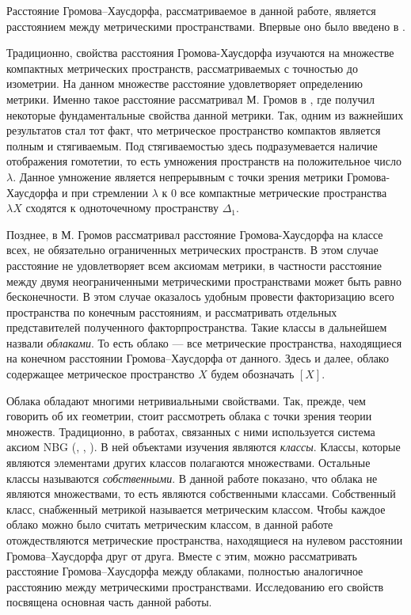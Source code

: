 Расстояние Громова--Хаусдорфа, рассматриваемое в данной работе,
является расстоянием
между метрическими пространствами. Впервые оно было введено в \cite{Edwards}.

Традиционно, свойства расстояния
Громова-Хаусдорфа
изучаются на множестве компактных метрических пространств,
рассматриваемых с точностью до изометрии. На данном множестве
расстояние удовлетворяет определению метрики. Именно такое расстояние
рассматривал М. Громов в \cite{gromov_structures_1981}, где получил
некоторые фундаментальные свойства данной метрики. Так, одним из
важнейших результатов стал тот факт, что метрическое пространство
компактов является полным и стягиваемым. Под стягиваемостью здесь
подразумевается наличие отображения гомотетии, то есть умножения
пространств на положительное число \( \lambda  \). Данное умножение
является непрерывным с точки зрения метрики Громова-Хаусдорфа и при
стремлении \( \lambda  \) к \( 0 \) все компактные метрические
пространства \( \lambda X \) сходятся к одноточечному пространству \(
\Delta _1 \).

Позднее, в \cite{gromov_metric_2001} М. Громов рассматривал
расстояние Громова-Хаусдорфа на классе всех, не обязательно
ограниченных метрических пространств. В этом случае расстояние не
удовлетворяет всем аксиомам метрики, в частности расстояние между
двумя неограниченными метрическими пространствами может быть равно
бесконечности. В этом случае оказалось удобным провести факторизацию
всего пространства по конечным расстояниям, и рассматривать отдельных
представителей полученного факторпространства. Такие классы в
дальнейшем назвали \emph{облаками}. То есть облако --- все
метрические пространства, находящиеся на конечном расстоянии
Громова--Хаусдорфа от данного. Здесь и далее, облако содержащее
метрическое пространство \( X \) будем обозначать \( [X] \).

Облака обладают многими нетривиальными свойствами. Так, прежде, чем
говорить об их геометрии, стоит рассмотреть облака с точки зрения
теории множеств. Традиционно, в работах, связанных с ними
используется система аксиом NBG (\cite{bernays_system_1937},
\cite{godel_consistency_1940}, \cite{neumann_1925}). В ней
объектами изучения являются \emph{классы}. Классы, которые являются
элементами других классов полагаются множествами. Остальные классы
называются \emph{собственными}. В данной работе показано, что облака
не являются множествами, то есть являются собственными классами.
Собственный класс, снабженный метрикой называется метрическим
классом. Чтобы каждое облако можно было считать метрическим классом,
в данной работе отождествляются метрические пространства, находящиеся
на нулевом расстоянии Громова--Хаусдорфа друг от друга. Вместе с
этим, можно рассматривать расстояние Громова--Хаусдорфа между
облаками, полностью аналогичное расстоянию между метрическими
пространствами. Исследованию его свойств посвящена основная часть данной работы.

